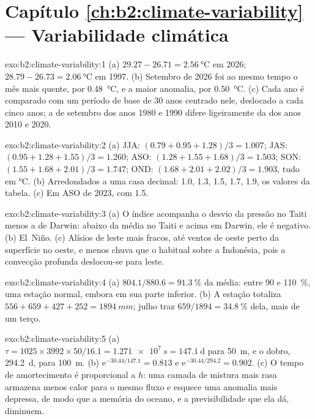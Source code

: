 \section*{Capítulo \ref{ch:b2:climate-variability} --- Variabilidade climática}

\begin{solution}{exo:b2:climate-variability:1}
(a) $29.27 - 26.71 = \qty{2.56}{\celsius}$ em 2026; $28.79 - 26.73 = \qty{2.06}{\celsius}$ em 1997.
(b) Setembro de 2026 foi ao mesmo tempo o mês mais quente, por \qty{0.48}{\celsius}, e a maior anomalia, por
\qty{0.50}{\celsius}. (c) Cada ano é comparado com um período de base de 30 anos centrado nele, deslocado
a cada cinco anos; a  de setembro dos anos 1980 e 1990 difere ligeiramente da dos
anos 2010 e 2020.
\end{solution}

\begin{solution}{exo:b2:climate-variability:2}
(a) JJA: $(0.79 + 0.95 + 1.28)/3 = 1.007$; JAS: $(0.95 + 1.28 + 1.55)/3 = 1.260$; ASO: $(1.28 +
1.55 + 1.68)/3 = 1.503$; SON: $(1.55 + 1.68 + 2.01)/3 = 1.747$; OND: $(1.68 + 2.01 + 2.02)/3 =
1.903$, tudo em \unit{\celsius}. (b) Arredondados a uma casa decimal: 1.0, 1.3, 1.5, 1.7, 1.9, os valores da
tabela. (c) Em ASO de 2023, com 1.5.
\end{solution}

\begin{solution}{exo:b2:climate-variability:3}
(a) O índice acompanha o desvio da pressão no Taiti menos a de Darwin: abaixo da média
no Taiti e acima em Darwin, ele é negativo. (b) El~Niño. (c) Alísios de leste mais fracos, até
ventos de oeste perto da superfície no oeste, e menos chuva que o habitual sobre a Indonésia, pois a
convecção profunda deslocou-se para leste.
\end{solution}

\begin{solution}{exo:b2:climate-variability:4}
(a) $804.1/880.6 = \qty{91.3}{\percent}$ da média: entre 90 e \qty{110}{\percent}, uma
estação normal, embora em sua parte inferior. (b) A estação totaliza $556 + 659 + 427 + 252 =
\qty{1894}{mm}$; julho traz $659/1894 = \qty{34.8}{\percent}$ dela, mais de um terço.
\end{solution}

\begin{solution}{exo:b2:climate-variability:5}
(a) $\tau = 1025 \times 3992 \times 50/16.1 = \qty{1.271e7}{s} = \qty{147.1}{\day}$ para
\qty{50}{m}, e o dobro, \qty{294.2}{\day}, para \qty{100}{m}. (b) $\mathrm{e}^{-30.44/147.1} =
0.813$ e $\mathrm{e}^{-30.44/294.2} = 0.902$. (c) O tempo de amortecimento é proporcional a $h$: uma
camada de mistura mais rasa armazena menos calor para o mesmo fluxo e esquece uma anomalia mais depressa, de modo que a
memória do oceano, e a previsibilidade que ela dá, diminuem.
\end{solution}

